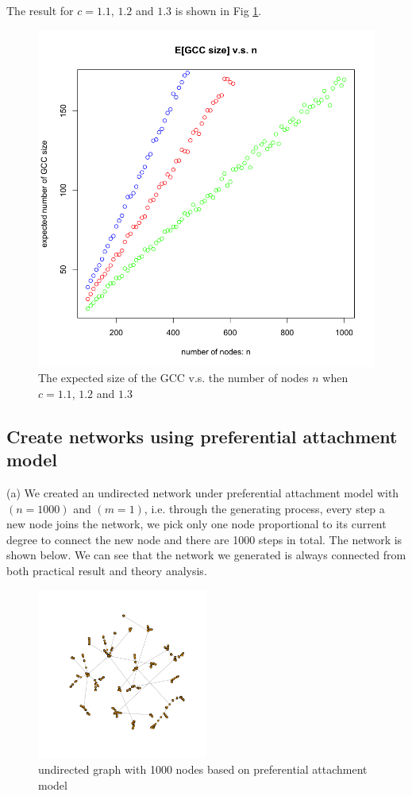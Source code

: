 \documentclass[draftcls,12pt,onecolumn]{IEEEtran}
\begin{document}
The result for $c=1.1$, $1.2$ and $1.3$ is shown in Fig \ref{fig14}.
\begin{figure}[H]
\centering
\includegraphics[scale=0.3]{figures_part1_1/output_24_0.png}
\caption{The expected size of the GCC v.s. the number of nodes $n$ when $c=1.1$, $1.2$ and $1.3$}
\label{fig14}
\end{figure}







\subsection{Create networks using preferential attachment model}
(a) We created an undirected network under preferential attachment model with $( n = 1000 )$ and $( m = 1 )$, i.e. through the generating process, every step a new node joins the network, we pick only one node proportional to its current degree to connect the new node and there are 1000 steps in total. The network is shown below. We can see that the network we generated is always connected from both practical result and theory analysis.
\begin{figure}[H]
\centering
\includegraphics[width=0.5\textwidth]{1_2_a_network.png}
\caption{undirected graph with 1000 nodes based on preferential attachment model}
\end{figure}
\end{document}
